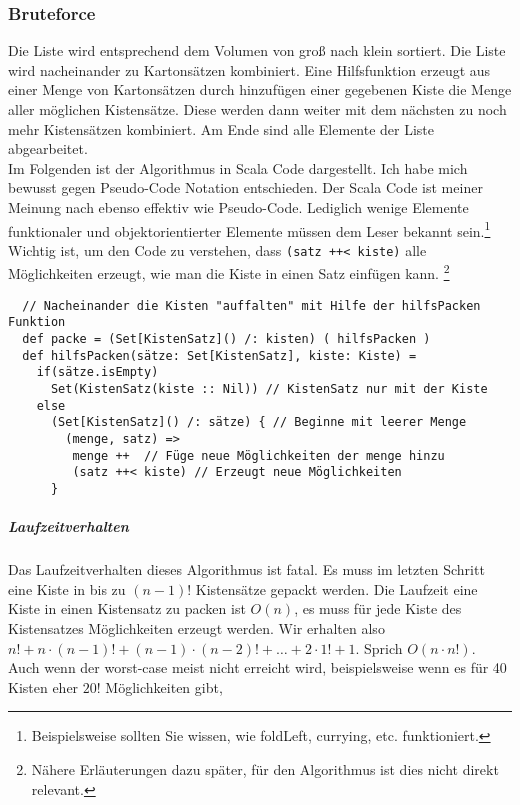 \subsubsection{Bruteforce}
\lstset{language=Scala} %
\lstset{basicstyle=\scriptsize}
Die Liste wird entsprechend dem Volumen von groß nach klein sortiert.
Die Liste wird nacheinander zu Kartonsätzen kombiniert.
Eine Hilfsfunktion erzeugt aus einer Menge von Kartonsätzen durch hinzufügen einer gegebenen Kiste die Menge aller möglichen Kistensätze.
Diese werden dann weiter mit dem nächsten zu noch mehr Kistensätzen kombiniert.
Am Ende sind alle Elemente der Liste abgearbeitet. \\
Im Folgenden ist der Algorithmus in Scala Code dargestellt. Ich habe mich bewusst gegen Pseudo-Code Notation entschieden.
Der Scala Code ist meiner Meinung nach ebenso effektiv wie Pseudo-Code.
Lediglich wenige Elemente funktionaler und objektorientierter Elemente müssen dem Leser bekannt sein.\footnote{Beispielsweise sollten Sie wissen, wie foldLeft, currying, etc. funktioniert.}\\
Wichtig ist, um den Code zu verstehen, dass \lstinline|(satz ++< kiste)| alle Möglichkeiten erzeugt, wie man die Kiste in einen Satz einfügen kann.
\footnote{Nähere Erläuterungen dazu später, für den Algorithmus ist dies nicht direkt relevant.}
\lstset{language=Scala}
\lstset{basicstyle=\small}
\begin{lstlisting}
  // Nacheinander die Kisten "auffalten" mit Hilfe der hilfsPacken Funktion
  def packe = (Set[KistenSatz]() /: kisten) ( hilfsPacken )
  def hilfsPacken(sätze: Set[KistenSatz], kiste: Kiste) =
    if(sätze.isEmpty)
      Set(KistenSatz(kiste :: Nil)) // KistenSatz nur mit der Kiste
    else
      (Set[KistenSatz]() /: sätze) { // Beginne mit leerer Menge
        (menge, satz) =>
         menge ++  // Füge neue Möglichkeiten der menge hinzu
         (satz ++< kiste) // Erzeugt neue Möglichkeiten
      }
\end{lstlisting}
\subparagraph{Laufzeitverhalten}
Das Laufzeitverhalten dieses Algorithmus ist fatal. Es muss im letzten Schritt eine Kiste in bis zu $(n-1)!$ Kistensätze gepackt werden.
Die Laufzeit eine Kiste in einen Kistensatz zu packen ist $O(n)$, es muss für jede Kiste des Kistensatzes Möglichkeiten erzeugt werden.
Wir erhalten also $n! + n \cdot (n-1)! +  (n-1) \cdot (n-2)! + \dots + 2 \cdot 1! + 1$. Sprich $O(n \cdot n!)$. \\
Auch wenn der worst-case meist nicht erreicht wird, beispielsweise wenn es für 40 Kisten eher $20!$ Möglichkeiten gibt,

